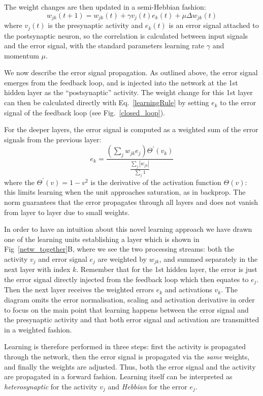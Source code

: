\documentclass[Afour,sageh,times]{sagej}
\begin{document}
The weight changes are then updated in a semi-Hebbian fashion:
\begin{equation}
  w_{jk}(t+1) = w_{jk}(t) + \gamma v_j(t)  e_k(t) + \mu \Delta w_{jk}(t) \label{learningRule}
\end{equation}
where $v_j(t)$ is the presynaptic activity and $e_k(t)$ is an error
signal attached to the postsynaptic neuron, so the correlation is
calculated between input signals and the error signal, with the
standard parameters learning rate $\gamma$ and momentum $\mu$.

We now describe the error signal propagation. As outlined above, the
error signal emerges from the feedback loop, and is injected into the
network at the 1st hidden layer as the ``postsynaptic'' activity. The
weight change for this 1st layer can then be calculated directly with
Eq.~\ref{learningRule} by setting $e_k$ to the error signal of the
feedback loop (see Fig.~\ref{closed_loop}).

For the deeper layers, the error signal is computed as a weighted
sum of the error signals from the previous layer:
\begin{equation}
  e_k = \frac{\left( \sum_j w_{jk} e_{j} \right) \Theta^\prime (v_k) }{\frac{\sum_j {|w_{jk}|}}{\sum_j 1}}
  \label{deepError}
\end{equation}
where the $\Theta^\prime (v) = 1 - v^2$ is the derivative of the
activation function $\Theta(v)$: this limits learning when the unit
approaches saturation, as in backprop. The norm guarantees that
the error propagates through all layers and does not vanish from
layer to layer due to small weights.

In order to have an intuition about this novel learning approach we
have drawn one of the learning units establishing a layer which is
shown in Fig~\ref{netw_together}B, where we see the two processing
streams: both the activity $v_j$ and error signal $e_j$ are weighted
by $w_{jk}$, and summed separately in the next layer with index $k$.
Remember that for the 1st hidden layer, the error is just the error
signal directly injected from the feedback loop which then equates to
$e_j$. Then the next layer receives the weighted errors $e_k$ and
activations $v_k$. The diagram omits the error normalisation, scaling
and activation derivative in order to focus on the main point that
learning happens between the error signal and the presynaptic activity
and that both error signal and activation are transmitted in a
weighted fashion.

Learning is therefore performed in three steps: first the activity is
propagated through the network, then the error signal is propagated
via the \textsl{same} weights, and finally the weights are adjusted. Thus,
both the error signal and the activity are propagated in a forward
fashion. Learning itself can be interpreted as \textsl{heterosynaptic} for the
activity $v_j$ and \textsl{Hebbian} for the error $e_j$.
\end{document}
